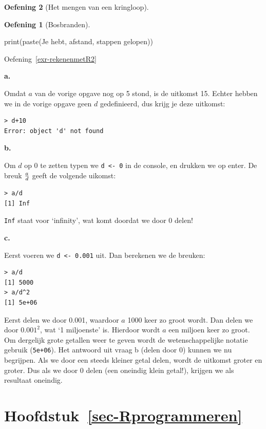 \documentclass[
  a4paper,
]{scrbook}
\newenvironment{Shaded}{\begin{snugshade}}{\end{snugshade}}
\newcommand{\FunctionTok}[1]{\textcolor[rgb]{0.28,0.35,0.67}{#1}}
\newcommand{\NormalTok}[1]{\textcolor[rgb]{0.00,0.23,0.31}{#1}}
\newcommand{\StringTok}[1]{\textcolor[rgb]{0.13,0.47,0.30}{#1}}
\theoremstyle{definition}
\newtheorem{exercise}{Oefening}[chapter]
\theoremstyle{remark}
\begin{document}
\begin{exercise}[Het mengen van een
kringloop]
\begin{exercise}[Bosbranden]
\begin{Shaded}
\begin{Highlighting}[]
\FunctionTok{print}\NormalTok{(}\FunctionTok{paste}\NormalTok{(}\StringTok{\textquotesingle{}Je hebt\textquotesingle{}}\NormalTok{, afstand, }\StringTok{\textquotesingle{}stappen gelopen\textquotesingle{}}\NormalTok{))}
\end{Highlighting}
\end{Shaded}

Oefening~\ref{exr-rekenenmetR2}

\textbf{a.}

Omdat \(a\) van de vorige opgave nog op 5 stond, is de uitkomst 15.
Echter hebben we in de vorige opgave geen \(d\) gedefinieerd, dus krijg
je deze uitkomst:

\begin{verbatim}
> d+10
Error: object 'd' not found
\end{verbatim}

\textbf{b.}

Om \(d\) op 0 te zetten typen we \texttt{d\ \textless{}-\ 0} in de
console, en drukken we op enter. De breuk \(a \over d\) geeft de
volgende uikomst:

\begin{verbatim}
> a/d
[1] Inf
\end{verbatim}

\texttt{Inf} staat voor `infinity', wat komt doordat we door \(0\)
delen!

\textbf{c.}

Eerst voeren we \texttt{d\ \textless{}-\ 0.001} uit. Dan berekenen we de
breuken:

\begin{verbatim}
> a/d
[1] 5000
> a/d^2
[1] 5e+06
\end{verbatim}

Eerst delen we door 0.001, waardoor \(a\) 1000 keer zo groot wordt. Dan
delen we door \(0.001^2\), wat `1 miljoenste' is. Hierdoor wordt \(a\)
een miljoen keer zo groot. Om dergelijk grote getallen weer te geven
wordt de wetenschappelijke notatie gebruik (\texttt{5e+06}). Het
antwoord uit vraag b (delen door 0) kunnen we nu begrijpen. Als we door
een steeds kleiner getal delen, wordt de uitkomst groter en groter. Dus
als we door 0 delen (een oneindig klein getal!), krijgen we als
resultaat oneindig.

\section*{\texorpdfstring{Hoofdstuk~\ref{sec-Rprogrammeren}}{Hoofdstuk~}}\label{sec-rprogrammeren}


\end{exercise}
\end{exercise}
\end{document}
